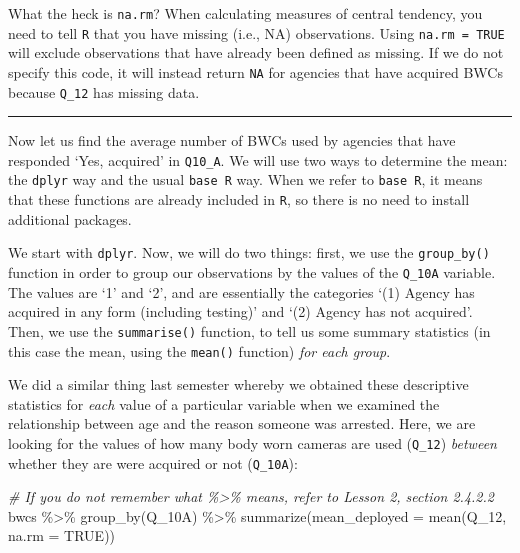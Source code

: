 \documentclass[
]{book}
\newenvironment{Shaded}{\begin{snugshade}}{\end{snugshade}}
\newcommand{\AttributeTok}[1]{\textcolor[rgb]{0.77,0.63,0.00}{#1}}
\newcommand{\CommentTok}[1]{\textcolor[rgb]{0.56,0.35,0.01}{\textit{#1}}}
\newcommand{\ConstantTok}[1]{\textcolor[rgb]{0.00,0.00,0.00}{#1}}
\newcommand{\FunctionTok}[1]{\textcolor[rgb]{0.00,0.00,0.00}{#1}}
\newcommand{\NormalTok}[1]{#1}
\newcommand{\SpecialCharTok}[1]{\textcolor[rgb]{0.00,0.00,0.00}{#1}}
\begin{document}
What the heck is \texttt{na.rm}? When calculating measures of central tendency, you need to tell \texttt{R} that you have missing (i.e., NA) observations. Using \texttt{na.rm\ =\ TRUE} will exclude observations that have already been defined as missing. If we do not specify this code, it will instead return \texttt{NA} for agencies that have acquired BWCs because \texttt{Q\_12} has missing data.

\begin{center}\rule{0.5\linewidth}{0.5pt}\end{center}

Now let us find the average number of BWCs used by agencies that have responded `Yes, acquired' in \texttt{Q10\_A}. We will use two ways to determine the mean: the \texttt{dplyr} way and the usual \texttt{base\ R} way. When we refer to \texttt{base\ R}, it means that these functions are already included in \texttt{R}, so there is no need to install additional packages.

We start with \texttt{dplyr}. Now, we will do two things: first, we use the \texttt{group\_by()} function in order to group our observations by the values of the \texttt{Q\_10A} variable. The values are `1' and `2', and are essentially the categories `(1) Agency has acquired in any form (including testing)' and `(2) Agency has not acquired'. Then, we use the \texttt{summarise()} function, to tell us some summary statistics (in this case the mean, using the \texttt{mean()} function) \emph{for each group}.

We did a similar thing last semester whereby we obtained these descriptive statistics for \emph{each} value of a particular variable when we examined the relationship between age and the reason someone was arrested. Here, we are looking for the values of how many body worn cameras are used (\texttt{Q\_12}) \emph{between} whether they are were acquired or not (\texttt{Q\_10A}):

\begin{Shaded}
\begin{Highlighting}[]
\CommentTok{\# If you do not remember what \textquotesingle{}\%\textgreater{}\%\textquotesingle{} means, refer to Lesson 2, section 2.4.2.2}
\NormalTok{bwcs }\SpecialCharTok{\%\textgreater{}\%} 
  \FunctionTok{group\_by}\NormalTok{(Q\_10A) }\SpecialCharTok{\%\textgreater{}\%} 
  \FunctionTok{summarize}\NormalTok{(}\AttributeTok{mean\_deployed =} \FunctionTok{mean}\NormalTok{(Q\_12, }\AttributeTok{na.rm =} \ConstantTok{TRUE}\NormalTok{))}
\end{Highlighting}
\end{Shaded}
\end{document}
